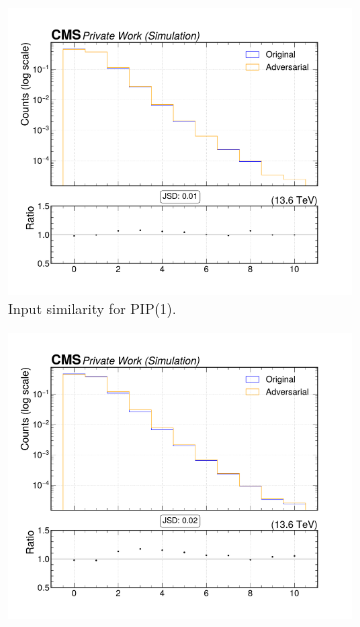 \begin{figure}[htbp]
  \centering
  \begin{subfigure}[t]{0.32\textwidth}
    \includegraphics[width=\linewidth]{media/output/features/compare/intprob_1/cmp_global_features_nsv.pdf}
    \caption{Input similarity for PIP(1).}
  \end{subfigure}\hfill
  \begin{subfigure}[t]{0.32\textwidth}
    \includegraphics[width=\linewidth]{media/output/features/compare/intprob_2/cmp_global_features_nsv.pdf}

\end{subfigure}
\end{figure}
